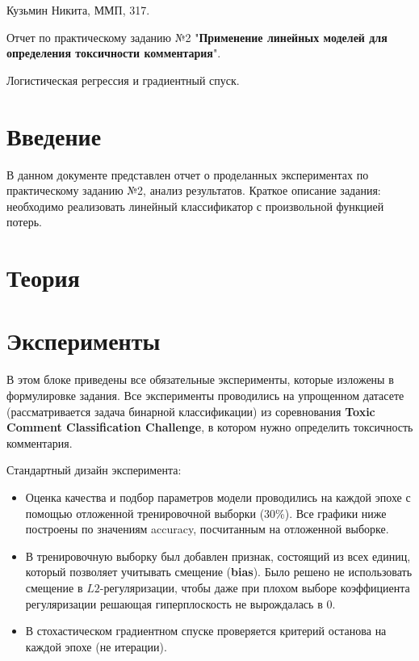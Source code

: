 \documentclass[a4paper, 11pt]{article}
\begin{document}
    \hfill Кузьмин Никита, ММП, 317.
    
    \begin{center} \Large Отчет по практическому заданию №2 "\textbf{Применение линейных моделей для определения токсичности комментария}". 
    
    Логистическая регрессия и градиентный спуск.
    \end{center}
    \tableofcontents
    \newpage
    \section{Введение}
    
    В данном документе представлен отчет о проделанных экспериментах по практическому заданию №2, анализ результатов. 
    Краткое описание задания: необходимо реализовать линейный классификатор с произвольной функцией потерь.
    
    \section{Теория}
    
    \section{Эксперименты}
    В этом блоке приведены все обязательные эксперименты, которые изложены в формулировке задания.
    Все эксперименты проводились на упрощенном датасете (рассматривается задача бинарной классификации) из соревнования \textbf{Toxic Comment Classification Challenge}, в котором нужно определить токсичность комментария. 
    
    Стандартный дизайн эксперимента: 
    \begin{itemize}
        \item Оценка качества и подбор параметров модели проводились на каждой эпохе с помощью отложенной тренировочной выборки (30\%). Все графики ниже построены по значениям accuracy, посчитанным на отложенной выборке.
        \item В тренировочную выборку был добавлен признак, состоящий из всех единиц, который позволяет учитывать смещение (\textbf{bias}). Было решено не использовать смещение в $L2$-регуляризации, чтобы даже при плохом выборе коэффициента регуляризации решающая гиперплоскость не вырождалась в 0.
        \item В стохастическом градиентном спуске проверяется критерий останова на каждой эпохе (не итерации).
    \end{itemize}
\end{document}

